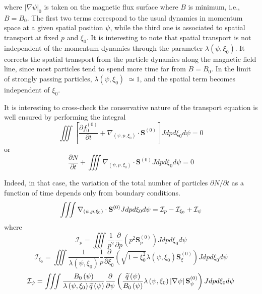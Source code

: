 where $\left| \nabla \psi \right| _{0}$ is taken on the magnetic flux
surface where $B$ is minimum, i.e., $B=B_{0}.$ The first two terms
correspond to the usual dynamics in momentum space at a given spatial
position $\psi $, while the third one is associated to spatial transport at
fixed $p$ and $\xi _{0}$. It is interesting to note that spatial transport
is not independent of the momentum dynamics through the parameter $\lambda
\left( \psi ,\xi _{0}\right) .$ It corrects the spatial transport from the
particle dynamics along the magnetic field line, since most particles tend
to spend more time far from $B=B_{0}$. In the limit of strongly passing
particles, $\lambda \left( \psi ,\xi _{0}\right) $ $\simeq 1$, and the
spatial term becomes independent of $\xi _{0}.$

It is interesting to cross-check the conservative nature of the transport
equation is well ensured by performing the integral
\begin{equation}
\iiint \left[ \frac{\partial f_{0}^{\left( 0\right) }}{\partial t}+\nabla
_{\left( \psi ,p,\xi _{0}\right) }\cdot \mathbf{S}^{\left( 0\right) }\right]
Jdpd\xi _{0}d\psi =0
\end{equation}
or
\begin{equation}
\frac{\partial N}{\partial t}+\iiint \nabla _{\left( \psi ,p,\xi _{0}\right)
}\cdot \mathbf{S}^{\left( 0\right) }Jdpd\xi _{0}d\psi =0
\end{equation}

Indeed, in that case, the variation of the total number of particles $%
\partial N/\partial t$ as a function of time depends only from boundary
conditions.
\begin{equation}
\iiint \nabla _{\left( \psi ,p,\xi _{0}\right) }\cdot \mathbf{S}^{\left(
0\right) }Jdpd\xi _{0}d\psi =\mathcal{I}_{p}-\mathcal{I}_{\xi _{0}}+\mathcal{%
I}_{\psi }
\end{equation}
where
\begin{equation}
\mathcal{I}_{p}=\iiint \frac{1}{p^{2}}\frac{\partial }{\partial p}\left(
p^{2}\mathbf{S}_{p}^{\left( 0\right) }\right) Jdpd\xi _{0}d\psi
\end{equation}
\begin{equation}
\mathcal{I}_{\xi _{0}}=\iiint \frac{1}{\lambda \left( \psi ,\xi _{0}\right) }%
\frac{1}{p}\frac{\partial }{\partial \xi _{0}}\left( \sqrt{1-\xi _{0}^{2}}%
\lambda \left( \psi ,\xi _{0}\right) \mathbf{S}_{\xi }^{\left( 0\right)
}\right) Jdpd\xi _{0}d\psi
\end{equation}
\begin{equation}
\mathcal{I}_{\psi }=\iiint \frac{B_{0}\left( \psi \right) }{\lambda \left(
\psi ,\xi _{0}\right) \widetilde{q}\left( \psi \right) }\frac{\partial }{%
\partial \psi }\left( \frac{\widetilde{q}\left( \psi \right) }{B_{0}\left(
\psi \right) }\lambda \left( \psi ,\xi _{0}\right) \left| \nabla \psi
\right| \mathbf{S}_{\psi }^{\left( 0\right) }\right) Jdpd\xi _{0}d\psi
\end{equation}


